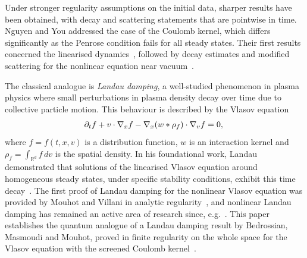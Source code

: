 \documentclass[10pt,a4paper]{amsart}
\providecommand{\eg}{e.g.\ }
\theoremstyle{plain}
\theoremstyle{remark}
\newcommand{\p}{\partial}
\newcommand{\R}{\mathbb{R}}
\begin{document}
Under stronger regularity assumptions on the initial data, sharper results have been obtained, with decay and scattering statements that are pointwise in time. Nguyen and You addressed the case of the Coulomb kernel, which differs significantly as the Penrose condition fails for all steady states. Their first results concerned the linearised dynamics~\cite{NguyenYou2023}, followed by decay estimates and modified scattering for the nonlinear equation near vacuum~\cite{NguyenYou2024}.

The classical analogue is \textit{Landau damping}, a well-studied phenomenon in plasma physics where small perturbations in plasma density decay over time due to collective particle motion. This behaviour is described by the Vlasov equation
\begin{align}\label{VP}
\p_tf+v\cdot\nabla_xf-\nabla_x(w*\rho_f)\cdot\nabla_vf=0,\vphantom{2_B}
\end{align}where $f=f(t,x,v)$ is a distribution function, $w$ is an interaction kernel and $\rho_f=\int_{\R^d} f\,dv$ is the spatial density. In his foundational work, Landau demonstrated that solutions of the linearised Vlasov equation around homogeneous steady states, under specific stability conditions, exhibit this time decay~\cite{Landaupaper1946}. The first proof of Landau damping for the nonlinear Vlasov equation was provided by Mouhot and Villani in analytic regularity~\cite{mou-vil-2011}, and nonlinear Landau damping has remained an active area of research since, \eg \cite{bed-mas-mou-2016,BedrossianMasmoudiMouhot2018,GrenierNguyenRodnianski2021,BedrossianMasmoudiMouhot2022,IonescuPausaderWangWidmayer2024Poisson}. This paper establishes the quantum analogue of a Landau damping result by Bedrossian, Masmoudi and Mouhot, proved in finite regularity on the whole space for the Vlasov equation with the screened Coulomb kernel~\cite{BedrossianMasmoudiMouhot2018}.
\end{document}

